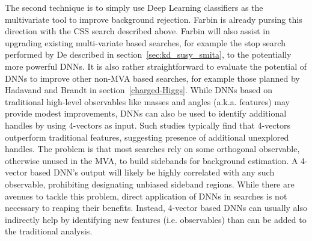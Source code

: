 The second technique is to simply use Deep Learning classifiers as the
multivariate tool to improve background rejection. Farbin is already
pursing this direction with the CSS search described above.  Farbin
will also assist in upgrading existing multi-variate based searches,
for example the stop search performed by De described in
section~\ref{sec:kd_susy_smita}, to the potentially more powerful
DNNs. It is also rather straightforward to evaluate the potential of
DNNs to improve other non-MVA based searches, for example those
planned by Hadavand and Brandt in section~\ref{charged-Higgs}. While
DNNs based on traditional high-level observables like masses and
angles (a.k.a. features) may provide modest improvements, DNNs can
also be used to identify additional handles by using 4-vectors as
input. Such studies typically find that 4-vectors outperform
traditional features, suggesting presence of additional unexplored
handles. The problem is that most searches rely on some orthogonal
observable, otherwise unused in the MVA, to build sidebands for
background estimation. A 4-vector based DNN's output will likely be
highly correlated with any such observable, prohibiting designating
unbiased sideband regions. While there are avenues to tackle this
problem, direct application of DNNs in searches is not necessary to
reaping their benefits. Instead, 4-vector based DNNs can usually also
indirectly help by identifying new features (i.e. observables) than
can be added to the traditional analysis.



